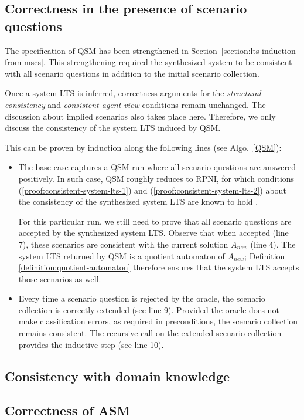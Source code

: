 
\subsection{Correctness in the presence of scenario questions\label{subsection:proof-with-scenario-questions}}

The specification of QSM has been strengthened in Section~\ref{section:lts-induction-from-mscs}. This strengthening required the synthesized system to be consistent with all scenario questions in addition to the initial scenario collection. 

Once a system LTS is inferred, correctness arguments for the \emph{structural consistency} and \emph{consistent agent view} conditions remain unchanged. The discussion about implied scenarios also takes place here. Therefore, we only discuss the consistency of the system LTS induced by QSM.

This can be proven by induction along the following lines (see Algo.~\ref{QSM}):
\begin{itemize}
\item The base case captures a QSM run where all scenario questions are answered positively. In such case, QSM roughly reduces to RPNI, for which conditions (\ref{proof:consistent-system-lts-1}) and (\ref{proof:consistent-system-lts-2}) about the consistency of the synthesized system LTS are known to hold \cite{Oncina:1993}.

For this particular run, we still need to prove that all scenario questions are accepted by the synthesized system LTS. Observe that when accepted (line 7), these scenarios are consistent with the current solution $A_{new}$ (line 4). The system LTS returned by QSM is a quotient automaton of $A_{new}$; Definition \ref{definition:quotient-automaton} therefore ensures that the system LTS accepts those scenarios as well.
\item Every time a scenario question is rejected by the oracle, the scenario collection is correctly extended (see line 9). Provided the oracle does not make classification errors, as required in preconditions, the scenario collection remains consistent. The recursive call on the extended scenario collection provides the inductive step (see line 10).
\end{itemize}


\subsection{Consistency with domain knowledge\label{subsection:proof-with-domain-knowledge}}


\subsection{Correctness of ASM\label{subsection:correctness-of-asm}}


